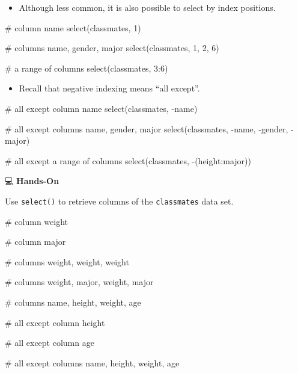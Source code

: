 \documentclass[
  letterpaper,
  DIV=11,
  numbers=noendperiod]{scrreprt}
\newenvironment{Shaded}{\begin{snugshade}}{\end{snugshade}}
\newcommand{\CommentTok}[1]{\textcolor[rgb]{0.37,0.37,0.37}{#1}}
\newcommand{\DecValTok}[1]{\textcolor[rgb]{0.68,0.00,0.00}{#1}}
\newcommand{\FunctionTok}[1]{\textcolor[rgb]{0.28,0.35,0.67}{#1}}
\newcommand{\NormalTok}[1]{\textcolor[rgb]{0.00,0.23,0.31}{#1}}
\newcommand{\SpecialCharTok}[1]{\textcolor[rgb]{0.37,0.37,0.37}{#1}}
\providecommand{\tightlist}{%
  \setlength{\itemsep}{0pt}\setlength{\parskip}{0pt}}\usepackage{longtable,booktabs,array}
\begin{document}
\begin{itemize}
\tightlist
\item
  Although less common, it is also possible to select by index
  positions.
\end{itemize}

\begin{Shaded}
\begin{Highlighting}[]
\CommentTok{\# column name}
\FunctionTok{select}\NormalTok{(classmates, }\DecValTok{1}\NormalTok{)}

\CommentTok{\# columns name, gender, major}
\FunctionTok{select}\NormalTok{(classmates, }\DecValTok{1}\NormalTok{, }\DecValTok{2}\NormalTok{, }\DecValTok{6}\NormalTok{)}

\CommentTok{\# a range of columns}
\FunctionTok{select}\NormalTok{(classmates, }\DecValTok{3}\SpecialCharTok{:}\DecValTok{6}\NormalTok{)}
\end{Highlighting}
\end{Shaded}

\begin{itemize}
\tightlist
\item
  Recall that negative indexing means ``all except''.
\end{itemize}

\begin{Shaded}
\begin{Highlighting}[]
\CommentTok{\# all except column name}
\FunctionTok{select}\NormalTok{(classmates, }\SpecialCharTok{{-}}\NormalTok{name)}

\CommentTok{\# all except columns name, gender, major}
\FunctionTok{select}\NormalTok{(classmates, }\SpecialCharTok{{-}}\NormalTok{name, }\SpecialCharTok{{-}}\NormalTok{gender, }\SpecialCharTok{{-}}\NormalTok{major)}

\CommentTok{\# all except a range of columns}
\FunctionTok{select}\NormalTok{(classmates, }\SpecialCharTok{{-}}\NormalTok{(height}\SpecialCharTok{:}\NormalTok{major))}
\end{Highlighting}
\end{Shaded}

💻 \textbf{Hands-On}

Use \texttt{select()} to retrieve columns of the \texttt{classmates}
data set.

\begin{Shaded}
\begin{Highlighting}[]
\CommentTok{\# column weight}

\CommentTok{\# column major}

\CommentTok{\# columns weight, weight, weight }

\CommentTok{\# columns weight, major, weight, major}

\CommentTok{\# columns name, height, weight, age}

\CommentTok{\# all except column height}

\CommentTok{\# all except column age}

\CommentTok{\# all except columns name, height, weight, age}
\end{Highlighting}
\end{Shaded}
\end{document}
